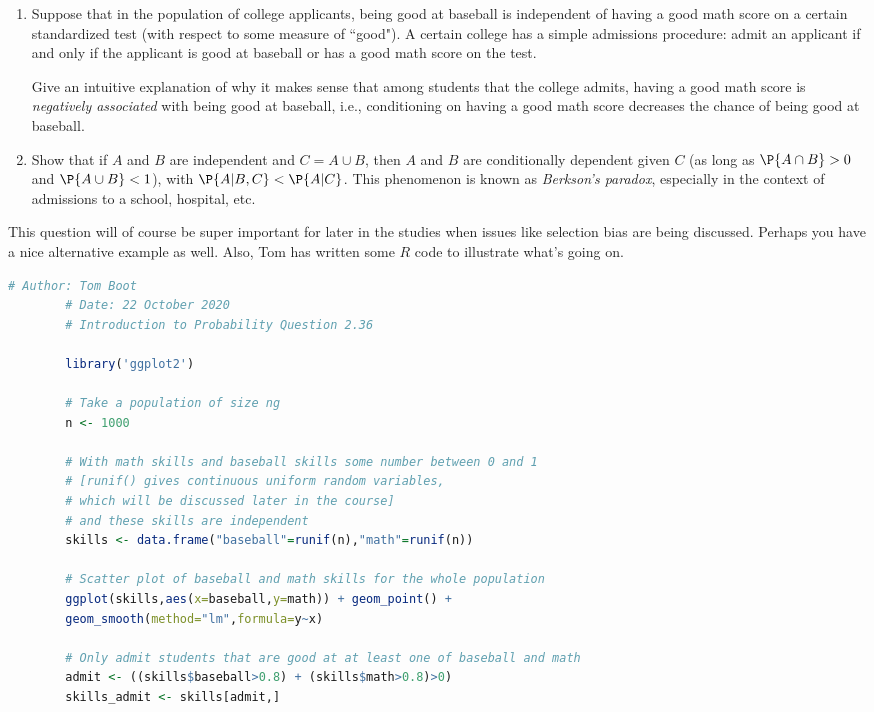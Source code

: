

\setcounter{theorem}{17}
\begin{exercise}[BH.2.36]
	\begin{enumerate}
		\item Suppose that in the population of college applicants, being good at baseball is independent of having a good math score on a certain standardized test (with respect to some measure of ``good"). A certain college has a simple admissions procedure: admit an applicant if and only if the applicant is good at baseball or has a good math score on the test.
	
		Give an intuitive explanation of why it makes sense that among students that the college admits, having a good math score is \emph{negatively associated} with being good at baseball, i.e., conditioning on having a good math score decreases the chance of being good at baseball.
		\item Show that if $A$ and $B$ are independent and $C = A \cup B$, then $A$ and $B$ are conditionally dependent given $C$ (as long as $\P{A \cap B} > 0$ and $\P{A \cup B} < 1$), with $\P{A|B, C} < \P{A|C}$. This phenomenon is known as \emph{Berkson's paradox}, especially in the context of admissions to a school, hospital, etc.
	\end{enumerate}
\begin{solution}
	This question will of course be super important for later in the studies when issues like selection bias are being discussed. Perhaps you have a nice alternative example as well. Also, Tom has written some $R$ code to illustrate what's going on.
	{\scriptsize \begin{lstlisting}[language=R]
		# Author: Tom Boot
		# Date: 22 October 2020
		# Introduction to Probability Question 2.36
		
		library('ggplot2')
		
		# Take a population of size ng
		n <- 1000
		
		# With math skills and baseball skills some number between 0 and 1
		# [runif() gives continuous uniform random variables, 
		# which will be discussed later in the course]
		# and these skills are independent
		skills <- data.frame("baseball"=runif(n),"math"=runif(n))
		
		# Scatter plot of baseball and math skills for the whole population
		ggplot(skills,aes(x=baseball,y=math)) + geom_point() + 
		geom_smooth(method="lm",formula=y~x)
		
		# Only admit students that are good at at least one of baseball and math
		admit <- ((skills$baseball>0.8) + (skills$math>0.8)>0)
		skills_admit <- skills[admit,]
		

\end{lstlisting}}
\end{solution}
\end{exercise}
